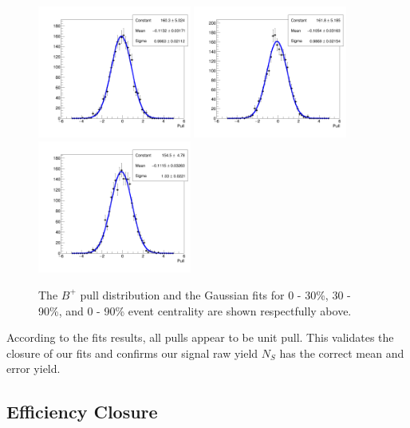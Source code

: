 \begin{figure}[h]
\begin{center}
\includegraphics[width= 0.45\textwidth]{Figures/Chapter4/BP_pull_signal_full_-1_0_90.png}
\includegraphics[width= 0.45\textwidth]{Figures/Chapter4/BP_pull_signal_full_-1_0_30.png}
\includegraphics[width= 0.45\textwidth]{Figures/Chapter4/BP_pull_signal_full_-1_30_90.png}
\caption{The $B^+$ pull distribution and the Gaussian fits for 0 - 30\%, 30 - 90\%, and 0 - 90\% event centrality are shown respectfully above.} 
\label{BPCentPull} 
\end{center}
\end{figure}




According to the fits results, all pulls appear to be unit pull. This validates the closure of our fits and confirms our signal raw yield $N_S$ has the correct mean and error yield.  

\subsection{Efficiency Closure}

